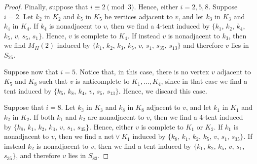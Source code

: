 \documentclass[12pt]{book}
\theoremstyle{plain}
\theoremstyle{remark}
\begin{document}
\begin{proof}
			 
	 Finally, suppose that $i \equiv 2 \pmod{3}$. Hence, either $i=2, 5, 8$.
	 Suppose $i=2$. Let $k_2$ in $K_2$ and $k_5$ in $K_5$ be vertices adjacent to $v$, and let $k_3$ in $K_3$ and $k_4$ in $K_4$. If $k_4$ is nonadjacent to $v$, then we find a $4$-tent induced by $\{k_1$, $k_2$, $k_4$, $k_5$, $v$, $s_5$, $s_1 \}$. Hence, $v$ is complete to $K_4$. If instead $v$ is nonadjacent to $k_3$, then we find $M_{II}(2)$ induced by $\{k_1$, $k_2$, $k_3$, $k_5$, $v$, $s_1$, $s_{35}$, $s_{13}\}$ and therefore $v$ lies in $S_{25}$.
	 
	 Suppose now that $i=5$. Notice that, in this case, there is no vertex $v$ adjacent to $K_5$ and $K_8$ such that $v$ is anticomplete to $K_1, \ldots, K_4$, since in that case we find a tent induced by $\{k_5$, $k_8$, $k_4$, $v$, $s_5$, $s_{13}\}$. Hence, we discard this case.
	 
	 Suppose that $i=8$. Let $k_3$ in $K_3$ and $k_8$ in $K_8$ adjacent to $v$, and let $k_1$ in $K_1$ and $k_2$ in $K_2$. If both $k_1$ and $k_2$ are nonadjacent to $v$, then we find a $4$-tent induced by $\{k_8$, $k_1$, $k_2$, $k_3$, $v$, $s_1$, $s_{35} \}$. Hence, either $v$ is complete to $K_1$ or $K_2$. If $k_1$ is nonadjacent to $v$, then we find a net${}\vee K_1$ induced by $\{k_8$, $k_1$, $k_2$, $k_5$, $v$, $s_1$, $s_{35} \}$. If instead $k_2$ is nonadjacent to $v$, then we find a tent induced by $\{k_1$, $k_2$, $k_5$, $v$, $s_1$, $s_{35} \}$, and therefore $v$ lies in $S_{83}$.
\end{proof}
\end{document}
